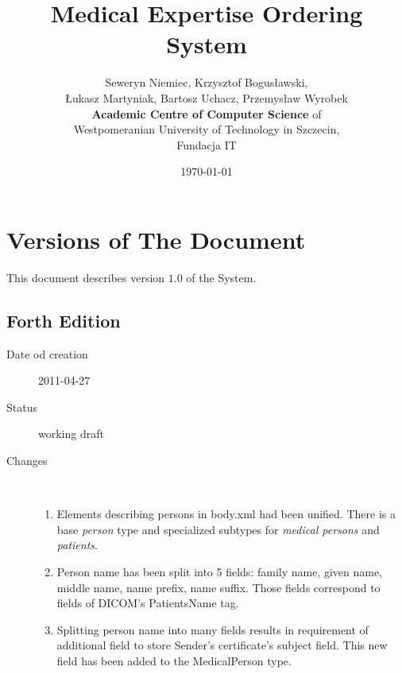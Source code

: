 \documentclass[a4paper]{article}
\begin{document}
\title{Medical Expertise Ordering System}
\author{Seweryn Niemiec, Krzysztof Bogusławski,\\ 
Łukasz Martyniak, Bartosz Uchacz, Przemysław Wyrobek \\ 
\textbf{Academic Centre of Computer Science } of \\ 
Westpomeranian University of Technology in Szczecin,\\
Fundacja IT}
\date{\today}
\maketitle
\tableofcontents
\listoffigures
\listoftables

\section{Versions of The Document}

This document describes version $1.0$ of the System.

\subsection{Forth Edition}
\begin{description}
  \item[Date od creation] 2011-04-27
  \item[Status] working draft
  \item[Changes] \hfill \\
   	\begin{enumerate}
  		\item Elements describing persons in body.xml had been unified. There is a
  		base \emph{person} type and specialized subtypes for \emph{medical persons}
  		and \emph{patients}.
  		\item Person name has been split into 5 fields: family name, given name,
  		middle name, name prefix, name suffix. Those fields correspond to
  		fields of DICOM's PatientsName tag.
  		\item Splitting person name into many fields results in requirement of
  		additional field to store Sender's certificate's subject field. This new
  		field has been added to the MedicalPerson type.
	\end{enumerate}
\end{description}
\end{document}
